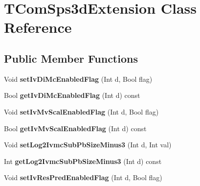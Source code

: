 \hypertarget{class_t_com_sps3d_extension}{}\section{T\+Com\+Sps3d\+Extension Class Reference}
\label{class_t_com_sps3d_extension}
\subsection*{Public Member Functions}
\begin{DoxyCompactItemize}
\item 
\mbox{\label{class_t_com_sps3d_extension_ac7528c8e7c7ffe3898f5b845fb926958}} 
Void {\bfseries set\+Iv\+Di\+Mc\+Enabled\+Flag} (Int d, Bool flag)
\item 
\mbox{\label{class_t_com_sps3d_extension_a03303635568c0e3477e244f2e4c78eef}} 
Bool {\bfseries get\+Iv\+Di\+Mc\+Enabled\+Flag} (Int d) const
\item 
\mbox{\label{class_t_com_sps3d_extension_a21d6bbfc2974f7a64ec3bdac13b9fbcf}} 
Void {\bfseries set\+Iv\+Mv\+Scal\+Enabled\+Flag} (Int d, Bool flag)
\item 
\mbox{\label{class_t_com_sps3d_extension_aa8f9c2f4f8be3576f8744a3eb563dea0}} 
Bool {\bfseries get\+Iv\+Mv\+Scal\+Enabled\+Flag} (Int d) const
\item 
\mbox{\label{class_t_com_sps3d_extension_a2db7ace45ee5e1e9b7f2084ad20e949b}} 
Void {\bfseries set\+Log2\+Ivmc\+Sub\+Pb\+Size\+Minus3} (Int d, Int val)
\item 
\mbox{\label{class_t_com_sps3d_extension_abba52328531bd2e45bed0fefd7aa00cd}} 
Int {\bfseries get\+Log2\+Ivmc\+Sub\+Pb\+Size\+Minus3} (Int d) const
\item 
\mbox{\label{class_t_com_sps3d_extension_aa8027276f1e9b832e7dc25cae16fac33}} 
Void {\bfseries set\+Iv\+Res\+Pred\+Enabled\+Flag} (Int d, Bool flag)
\item 
\mbox{\label{class_t_com_sps3d_extension_aea6b1823cf539b18da895b173274aa8e}} 

\end{DoxyCompactItemize}
